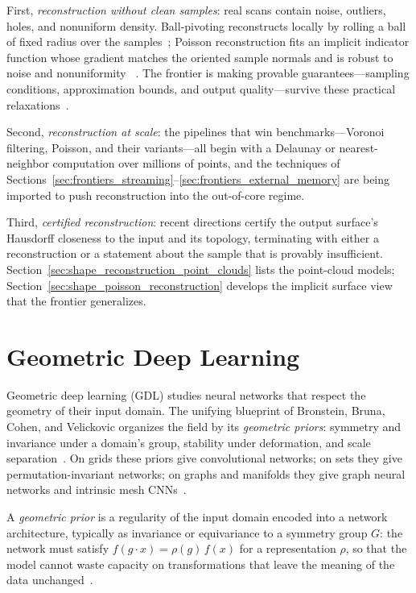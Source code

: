 First, \emph{reconstruction without clean samples}: real scans contain noise,
outliers, holes, and nonuniform density. Ball-pivoting reconstructs locally by
rolling a ball of fixed radius over the samples~\cite{bernardini1999}; Poisson
reconstruction fits an implicit indicator function whose gradient matches the
oriented sample normals and is robust to noise and nonuniformity
~\cite{kazhdan2006}. The frontier is making provable guarantees---sampling
conditions, approximation bounds, and output quality---survive these practical
relaxations~\cite{boissonnat2005}.

Second, \emph{reconstruction at scale}: the pipelines that win
benchmarks---Voronoi filtering, Poisson, and their variants---all begin with a
Delaunay or nearest-neighbor computation over millions of points, and the
techniques of Sections~\ref{sec:frontiers_streaming}--\ref{sec:frontiers_external_memory}
are being imported to push reconstruction into the out-of-core regime.

Third, \emph{certified reconstruction}: recent directions certify the output
surface's Hausdorff closeness to the input and its topology, terminating with
either a reconstruction or a statement about the sample that is provably
insufficient. Section~\ref{sec:shape_reconstruction_point_clouds} lists the
point-cloud models; Section~\ref{sec:shape_poisson_reconstruction} develops
the implicit surface view that the frontier generalizes.

\section{Geometric Deep Learning}
\label{sec:frontiers_deep_learning}

Geometric deep learning (GDL) studies neural
networks that respect the geometry of their input domain. The unifying
blueprint of Bronstein, Bruna, Cohen, and Velickovic organizes the field by its
\emph{geometric priors}: symmetry and invariance under a domain's group,
stability under deformation, and scale separation~\cite{bronstein2021}. On
grids these priors give convolutional networks; on sets they give
permutation-invariant networks; on graphs and manifolds they give graph neural
networks and intrinsic mesh CNNs~\cite{bronstein2021,bronstein2017}.

\begin{definition}\label{def:frontiers_geometric_prior}
A \emph{geometric prior} is a regularity of the input domain encoded into a
network architecture, typically as invariance or equivariance to a symmetry
group $G$: the network must satisfy $f(g \cdot x) = \rho(g)\, f(x)$ for a
representation $\rho$, so that the model cannot waste capacity on
transformations that leave the meaning of the data unchanged~\cite{bronstein2021}.
\end{definition}

